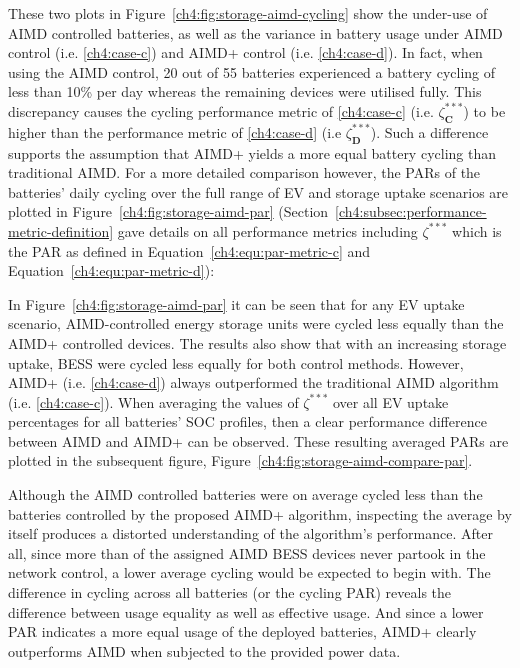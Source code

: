 

These two plots in Figure~\ref{ch4:fig:storage-aimd-cycling} show the under-use of AIMD controlled batteries, as well as the variance in battery usage under AIMD control (i.e. \ref{ch4:case-c}) and AIMD+ control (i.e. \ref{ch4:case-d}).
In fact, when using the AIMD control, 20 out of 55 batteries experienced a battery cycling of less than 10\% per day whereas the remaining devices were utilised fully.
This discrepancy causes the cycling performance metric of \ref{ch4:case-c} (i.e. $\zeta_\textbf{C}^{***}$) to be higher than the performance metric of \ref{ch4:case-d} (i.e $\zeta_\textbf{D}^{***}$).
Such a difference supports the assumption that AIMD+ yields a more equal battery cycling than traditional AIMD.
For a more detailed comparison however, the PARs of the batteries' daily cycling over the full range of EV and storage uptake scenarios are plotted in Figure~\ref{ch4:fig:storage-aimd-par} (Section~\ref{ch4:subsec:performance-metric-definition} gave details on all performance metrics including $\zeta^{***}$ which is the PAR as defined in Equation~\ref{ch4:equ:par-metric-c} and Equation~\ref{ch4:equ:par-metric-d}):



In Figure~\ref{ch4:fig:storage-aimd-par} it can be seen that for any EV uptake scenario, AIMD-controlled energy storage units were cycled less equally than the AIMD+ controlled devices.
The results also show that with an increasing storage uptake, BESS were cycled less equally for both control methods.
However, AIMD+ (i.e. \ref{ch4:case-d}) always outperformed the traditional AIMD algorithm (i.e. \ref{ch4:case-c}).
When averaging the values of $\zeta^{***}$ over all EV uptake percentages for all batteries' SOC profiles, then a clear performance difference between AIMD and AIMD+ can be observed.
These resulting averaged PARs are plotted in the subsequent figure, Figure~\ref{ch4:fig:storage-aimd-compare-par}.



Although the AIMD controlled batteries were on average cycled less than the batteries controlled by the proposed AIMD+ algorithm, inspecting the average by itself produces a distorted understanding of the algorithm's performance.
After all, since more than  of the assigned AIMD BESS devices never partook in the network control, a lower average cycling would be expected to begin with.
The difference in cycling across all batteries (or the cycling PAR) reveals the difference between usage equality as well as effective usage.
And since a lower PAR indicates a more equal usage of the deployed batteries, AIMD+ clearly outperforms AIMD when subjected to the provided power data.
